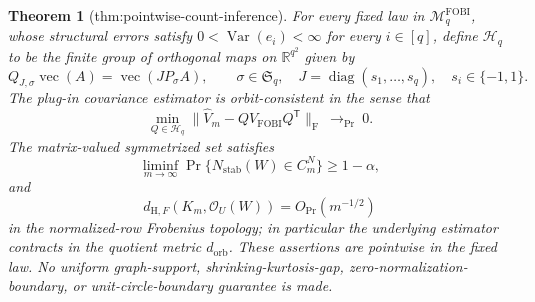 \documentclass{article}
\newtheorem{theorem}{Theorem}
\begin{document}
\begin{theorem}[thm:pointwise-count-inference]\label{thm:pointwise-count-inference}
For every fixed law in \(\mathcal M_q^{\mathrm{FOBI}}\), whose structural errors satisfy \(0<\operatorname{Var}(e_i)<\infty\) for every \(i\in[q]\), define \(\mathcal H_q\) to be the finite group of orthogonal maps on \(\mathbb R^{q^2}\) given by
\[
 Q_{J,\sigma}\operatorname{vec}(A)=\operatorname{vec}(J P_\sigma A),
 \qquad
 \sigma\in\mathfrak S_q,
 \quad
 J=\operatorname{diag}(s_1,\ldots,s_q),
 \quad s_i\in\{-1,1\}.
\]
The plug-in covariance estimator is orbit-consistent in the sense that
\[
 \min_{Q\in\mathcal H_q}
 \|\widehat V_m-QV_{\mathrm{FOBI}}Q^{\mathsf T}\|_{\mathrm F}
 \ \longrightarrow_{\Pr}\ 0.
\]
The matrix-valued symmetrized set satisfies
\[
 \liminf_{m\to\infty}
 \Pr\{N_{\mathrm{stab}}(W)\in C_m^N\}\geq1-\alpha,
\]
and
\[
 d_{\mathrm H,F}(K_m,\mathcal O_U(W))=O_{\Pr}(m^{-1/2})
\]
in the normalized-row Frobenius topology; in particular the underlying estimator contracts in the quotient metric \(d_{\mathrm{orb}}\). These assertions are pointwise in the fixed law. No uniform graph-support, shrinking-kurtosis-gap, zero-normalization-boundary, or unit-circle-boundary guarantee is made.
\end{theorem}
\end{document}
